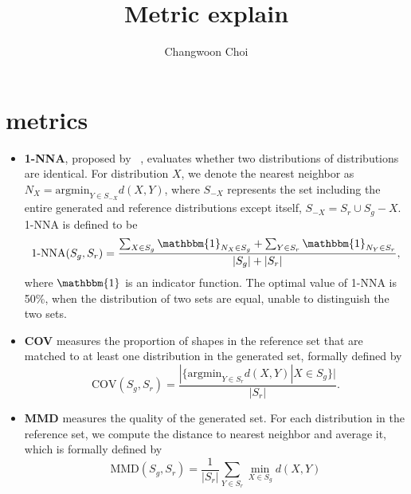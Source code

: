 \documentclass{article}
\title{Metric explain}
\author{Changwoon Choi}
\begin{document}
\maketitle
\section{metrics}
\begin{itemize}
\item \textbf{1-NNA}, proposed by ~\cite{1-nna}, evaluates whether two distributions of distributions are identical.
	For distribution $X$, we denote the nearest neighbor as $N_X = \text{argmin}_{Y \in S_{-X}}{d(X, Y)} $, where $S_{-X}$ represents the set including the entire generated and reference distributions except itself, $S_{-X} = S_r \cup S_g - {X}$.
	1-NNA is defined to be
	\begin{equation}
		\text{1-NNA}(S_g, S_r) = \frac{
			\sum_{X \in S_g}{\mathbbm{1}_{N_X \in S_g}} + \sum_{Y \in S_r}{\mathbbm{1}_{N_Y \in S_r}}
		}{|S_g| + |S_r|},
	\end{equation}
	where $\mathbbm{1}$ is an indicator function.
	The optimal value of 1-NNA is 50\%, when the distribution of two sets are equal, unable to distinguish the two sets.
\item \textbf{COV} measures the proportion of shapes in the reference set that are matched to at least one distribution in the generated set, formally defined by
\begin{equation}
	\text{COV}(S_g, S_r) = \frac{
		|\{\text{argmin}_{Y \in S_r} d(X, Y) | X \in S_g\}|
	}{|S_r|}.
\end{equation}
\item \textbf{MMD} measures the quality of the generated set.
	For each distribution in the reference set, we compute the distance to nearest neighbor and average it, which is formally defined by
	\begin{equation}
		\text{MMD}(S_g, S_r) = \frac{1}{|S_r|} \sum_{Y \in S_r}{\min_{X \in S_g}{d(X, Y)}}
	\end{equation}

\end{itemize}



\end{document}
